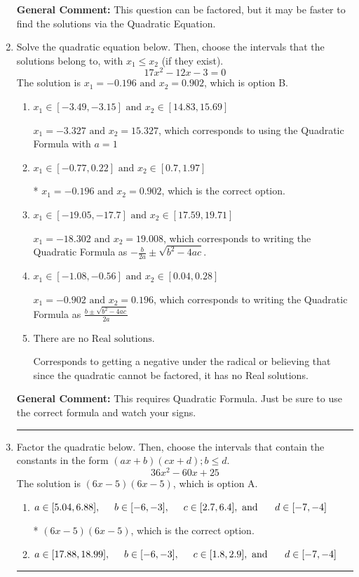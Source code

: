 \documentclass{extbook}[14pt]
\newcommand{\litem}[1]{\item #1

\rule{\textwidth}{0.4pt}}
\begin{document}
\begin{enumerate}
{\textbf{General Comment:} This question can be factored, but it may be faster to find the solutions via the Quadratic Equation.
}
\litem{
Solve the quadratic equation below. Then, choose the intervals that the solutions belong to, with $x_1 \leq x_2$ (if they exist).
\[ 17x^{2} -12 x -3 = 0 \]The solution is \( x_1 = -0.196 \text{ and } x_2 = 0.902 \), which is option B.\begin{enumerate}[label=\Alph*.]
\item \( x_1 \in [-3.49, -3.15] \text{ and } x_2 \in [14.83, 15.69] \)

 $x_1 = -3.327 \text{ and } x_2 = 15.327$, which corresponds to using the Quadratic Formula with $a=1$
\item \( x_1 \in [-0.77, 0.22] \text{ and } x_2 \in [0.7, 1.97] \)

* $x_1 = -0.196 \text{ and } x_2 = 0.902$, which is the correct option.
\item \( x_1 \in [-19.05, -17.7] \text{ and } x_2 \in [17.59, 19.71] \)

 $x_1 = -18.302 \text{ and } x_2 = 19.008$, which corresponds to writing the Quadratic Formula as $-\frac{b}{2a} \pm \sqrt{b^2 - 4ac}$.
\item \( x_1 \in [-1.08, -0.56] \text{ and } x_2 \in [0.04, 0.28] \)

 $x_1 = -0.902 \text{ and } x_2 = 0.196$, which corresponds to writing the Quadratic Formula as $\frac{b \pm \sqrt{b^2 - 4ac}}{2a}$
\item \( \text{There are no Real solutions.} \)

Corresponds to getting a negative under the radical or believing that since the quadratic cannot be factored, it has no Real solutions.
\end{enumerate}

\textbf{General Comment:} This requires Quadratic Formula. Just be sure to use the correct formula and watch your signs.
}
\litem{
Factor the quadratic below. Then, choose the intervals that contain the constants in the form $(ax+b)(cx+d); b \leq d.$
\[ 36x^{2} -60 x + 25 \]The solution is \( (6x -5)(6x -5) \), which is option A.\begin{enumerate}[label=\Alph*.]
\item \( a \in [5.04, 6.88], \hspace*{5mm} b \in [-6, -3], \hspace*{5mm} c \in [2.7, 6.4], \text{ and } \hspace*{5mm} d \in [-7, -4] \)

* $(6x -5)(6x -5)$, which is the correct option.
\item \( a \in [17.88, 18.99], \hspace*{5mm} b \in [-6, -3], \hspace*{5mm} c \in [1.8, 2.9], \text{ and } \hspace*{5mm} d \in [-7, -4] \)


\end{enumerate}}
\end{enumerate}
\end{document}
